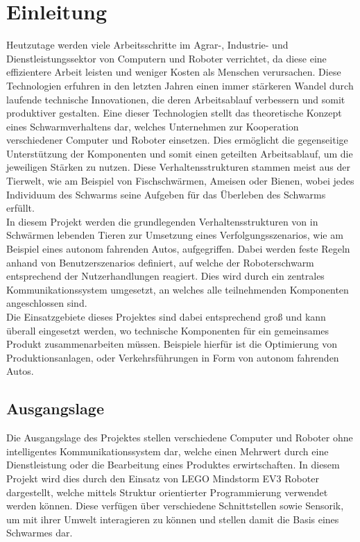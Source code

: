 \setcounter{page}{1}
\ofoot{\pagemark}

\section{Einleitung}

Heutzutage werden viele Arbeitsschritte im Agrar-, Industrie- und Dienstleistungssektor von Computern und Roboter verrichtet, da diese eine effizientere Arbeit leisten und weniger Kosten als Menschen verursachen. Diese Technologien erfuhren in den letzten Jahren einen immer stärkeren Wandel durch laufende technische Innovationen, die deren Arbeitsablauf verbessern und somit produktiver gestalten.
Eine dieser Technologien stellt das theoretische Konzept eines Schwarmverhaltens dar, welches Unternehmen zur Kooperation verschiedener Computer und Roboter einsetzen. Dies ermöglicht die gegenseitige Unterstützung der Komponenten und somit einen geteilten Arbeitsablauf, um die jeweiligen Stärken zu nutzen. Diese Verhaltensstrukturen stammen meist aus der Tierwelt, wie am Beispiel von Fischschwärmen, Ameisen oder Bienen, wobei jedes Individuum des Schwarms seine Aufgeben für das Überleben des Schwarms erfüllt.\\
In diesem Projekt werden die grundlegenden Verhaltensstrukturen von in Schwärmen lebenden Tieren zur Umsetzung eines Verfolgungsszenarios, wie am Beispiel eines autonom fahrenden Autos, aufgegriffen. Dabei werden feste Regeln anhand von Benutzerszenarios definiert, auf welche der Roboterschwarm entsprechend der Nutzerhandlungen reagiert. Dies wird durch ein zentrales Kommunikationssystem umgesetzt, an welches alle teilnehmenden Komponenten angeschlossen sind.\\
Die Einsatzgebiete dieses Projektes sind dabei entsprechend groß und kann überall eingesetzt werden, wo technische Komponenten für ein gemeinsames Produkt zusammenarbeiten müssen. Beispiele hierfür ist die Optimierung von Produktionsanlagen, oder Verkehrsführungen in Form von autonom fahrenden Autos.

\newpage
\subsection{Ausgangslage}

Die Ausgangslage des Projektes stellen verschiedene Computer und Roboter ohne intelligentes Kommunikationssystem dar, welche einen Mehrwert durch eine Dienstleistung oder die Bearbeitung eines Produktes erwirtschaften. In diesem Projekt wird dies durch den Einsatz von LEGO Mindstorm EV3 Roboter dargestellt, welche mittels Struktur orientierter Programmierung verwendet werden können. Diese verfügen über verschiedene Schnittstellen sowie Sensorik, um mit ihrer Umwelt interagieren zu können und stellen damit die Basis eines Schwarmes dar.

